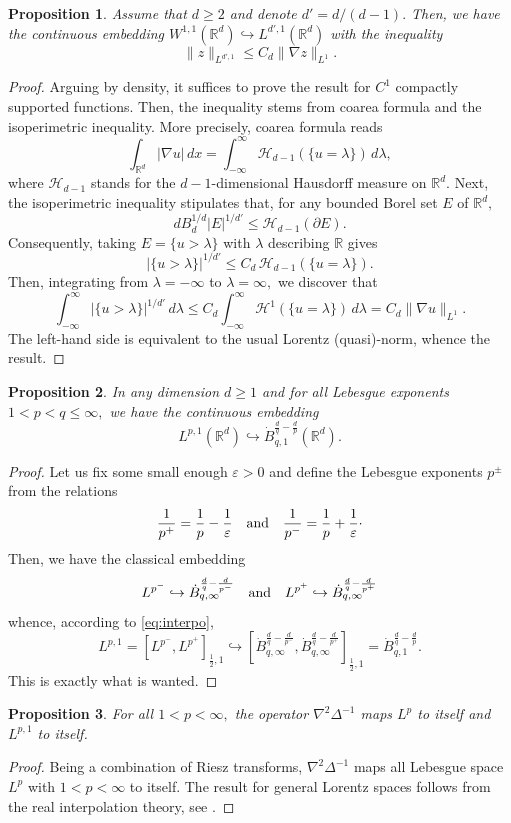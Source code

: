 \documentclass[11pt]{amsart}
\newtheorem{prop}{Proposition}[section]
\newcommand{\R}{{\mathbb R}}
\numberwithin{equation}{section}
\newcommand{\ep}{\varepsilon}
\newcommand{\nb}{\nabla}
\newcommand{\andf}{\quad\hbox{and}\quad}
\begin{document}
 
  
 
 \begin{prop} \label{l:Lorentz1} Assume that  $d\geq2$ and denote $d'=d/(d-1).$ Then,  we have the continuous embedding $W^{1,1}(\R^d)\hookrightarrow
 L^{d',1}(\R^d)$ with the inequality 
 $$ \|z\|_{L^{d',1}}\leq C_d\|\nabla z\|_{L^1}.$$
 \end{prop}
 \begin{proof} Arguing by density, it suffices to prove the result for $C^1$ compactly supported functions.
 Then,  the inequality stems from  coarea formula and the isoperimetric inequality. 
 More precisely, coarea formula reads 
   \[
   \int_{\mathbb{R}^d} |\nabla u| \, dx = \int_{-\infty}^\infty \mathcal{H}_{d-1}(\{u = \lambda\}) \, d\lambda,
   \]
   where  \(\mathcal{H}_{d-1}\) stands for the $d-1$-dimensional  Hausdorff measure on $\R^d.$
   \medbreak
   Next, the isoperimetric inequality stipulates that, for any bounded Borel set $E$ of $\R^d,$  
     \[ d  B_d^{1/d} |E|^{1/d'} \leq  \mathcal{H}_{d-1}(\partial E).\]
 Consequently, taking  \(E= \{u > \lambda\}\) with $\lambda$ describing $\R$ gives
   \[   |\{u > \lambda\}|^{1/d'} \leq C_d \, \mathcal{H}_{d-1}(\{u = \lambda\}).\]
   Then, integrating from $\lambda=-\infty$ to $\lambda=\infty,$ we discover that
   \[\int_{-\infty}^\infty |\{u > \lambda\}|^{1/d'} \, d\lambda \leq C_d\int_{-\infty}^\infty    \mathcal{H}^1(\{u = \lambda\}) \, d\lambda=C_d\|\nabla u\|_{L^1}. \]
   The left-hand side is equivalent to the usual 
   Lorentz (quasi)-norm, whence the result. 
 \end{proof}
 
 \begin{prop} \label{l:Lorentz2}  In any dimension $d\geq1$ and  for all Lebesgue exponents $1<p<q\leq\infty,$ we have the continuous embedding 
 $$L^{p,1}(\R^d)\hookrightarrow \dot B^{\frac dq-\frac dp}_{q,1}(\R^d). $$
 \end{prop}
 \begin{proof}
 Let us fix some small enough $\ep>0$ and define the Lebesgue exponents $p^\pm$ from the relations
 $$ \frac 1{p^+}=\frac 1p -\frac 1\ep\andf  \frac 1{p^-}=\frac 1p +\frac 1\ep\cdotp$$
 Then, we have the classical embedding
 $$
 L^{p^-}\hookrightarrow \dot B^{\frac dq-\frac d{p^-}}_{q,\infty}\andf L^{p^+}\hookrightarrow \dot B^{\frac dq-\frac d{p^+}}_{q,\infty}
 $$
 whence, according to \eqref{eq:interpo}, 
 $$ L^{p,1}=[L^{p^-},L^{p^+}]_{\frac12,1}\hookrightarrow[ \dot B^{\frac dq-\frac d{p^-}}_{q,\infty}, \dot B^{\frac dq-\frac d{p^+}}_{q,\infty}]_{\frac12,1}
=\dot B^{\frac dq-\frac dp}_{q,1}.$$
This is exactly what is wanted.  
 \end{proof}
 \begin{prop}\label{l:BS}  For all  $1<p<\infty,$ the  operator {$\nb^2\Delta^{-1}$} maps $L^p$ to itself and $L^{p,1}$ to itself.
 \end{prop}
 \begin{proof} Being a combination of Riesz transforms, {$\nb^2\Delta^{-1}$} maps all Lebesgue space
 $L^p$ with $1<p<\infty$ to itself. The result for general Lorentz spaces follows from the real interpolation 
 theory, see \cite{BL}. 
 \end{proof}
 
\end{document}
